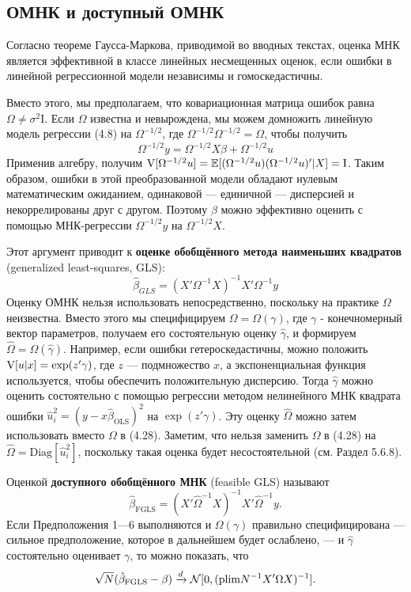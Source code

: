 \subsection{ОМНК и доступный ОМНК}

Согласно теореме Гаусса-Маркова, приводимой во вводных текстах, оценка МНК является эффективной в классе линейных несмещенных оценок, если ошибки в линейной регрессионной модели независимы и гомоскедастичны. 

Вместо этого, мы предполагаем, что ковариационная матрица ошибок равна $\Omega \neq \sigma^2\mathrm{I}$.  Если $\Omega$ известна и невырождена, мы можем домножить линейную модель регрессии (4.8) на $\Omega^{-1/2}$, где $\Omega^{-1/2}\Omega^{-1/2}=\Omega$, чтобы получить 
$$
\Omega^{-1/2} y  = \Omega^{-1/2} X\beta + \Omega^{-1/2} u
$$
Применив алгебру, получим $\mathrm{V} [\Omega^{-1/2} u] = \mathbb{E} [(\Omega^{-1/2} u)(\Omega^{-1/2} u)'|X] = \mathrm{I}$. Таким образом, ошибки в этой преобразованной модели обладают нулевым математическим ожиданием, одинаковой --- единичной --- дисперсией и некоррелированы друг с другом. Поэтому $\beta$ можно эффективно оценить с помощью МНК-регрессии $\Omega^{-1/2} y$ на $\Omega^{-1/2} X$. 

Этот аргумент приводит к \textbf{оценке обобщённого метода наименьших квадратов} (generalized least-squares, GLS):
\begin{equation}
\hat{\beta}_{GLS} = (X'\Omega^{-1}X)^{-1}X'\Omega^{-1}y
\end{equation}
Оценку ОМНК нельзя использовать непосредственно, поскольку на практике $\Omega$ неизвестна. Вместо этого мы специфицируем $\Omega = \Omega(\gamma)$, где $\gamma$ - конечномерный вектор параметров, получаем его состоятельную оценку $\hat{\gamma}$, и формируем $\hat{\Omega} =  \Omega(\hat{\gamma})$. Например, если ошибки гетероскедастичны, можно положить $\mathrm{V}[u|x] = \exp (z'\gamma)$, где $z$ --- подмножество $x$, а экспоненциальная функция используется, чтобы обеспечить положительную дисперсию. Тогда $\hat{\gamma}$ можно оценить состоятельно с помощью регрессии методом нелинейного МНК квадрата ошибки $\hat{u}^2_i = (y-x\hat{\beta}_{\text{OLS}})^2$ на $ \exp (z'\gamma)$. Эту оценку $\hat{\Omega}$ можно затем использовать вместо $\Omega$ в (4.28). Заметим, что нельзя  заменить $\Omega$ в (4.28) на $\hat{\Omega} =  \mathrm{Diag}[\hat{u}^2_i]$, поскольку такая оценка будет несостоятельной (см. Раздел 5.6.8).

Оценкой \textbf{доступного обобщённого МНК} (feasible GLS) называют
\begin{equation}
\hat{\beta}_{\text{FGLS}} = (X'\hat{\Omega}^{-1}X)^{-1}X'\hat{\Omega}^{-1}y.
\end{equation}
Если Предположения 1---6 выполняются и $\Omega(\gamma)$ правильно специфицирована --- сильное предположение, которое в дальнейшем будет ослаблено, --- и $\hat{\gamma}$ состоятельно оценивает $\gamma$, то можно показать, что
\begin{equation}
\sqrt{N}(\hat{\beta}_{\text{FGLS}} - \beta) \xrightarrow{d} \mathcal{N} [0, (\mathrm{plim } N^{-1}X'\Omega X)^{-1}].
\end{equation}

